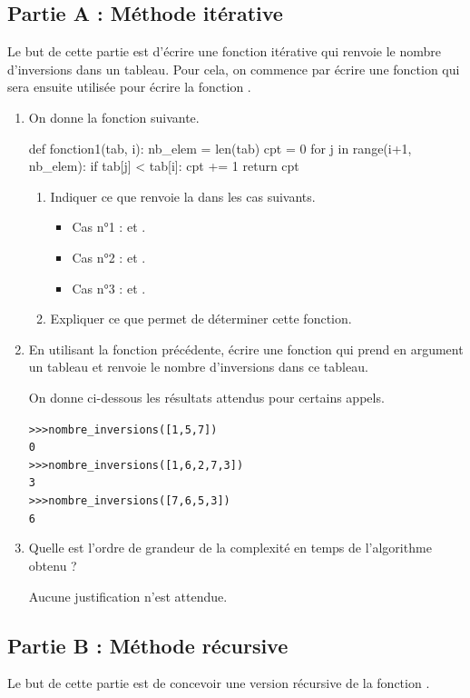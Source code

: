 \documentclass[11pt,a4paper,french,twoside]{PMCours}
\begin{document}
\subsection*{Partie A : Méthode itérative}
Le but de cette partie est d'écrire une fonction itérative  qui renvoie le
nombre d'inversions dans un tableau. Pour cela, on commence par écrire une fonction
 qui sera ensuite utilisée pour écrire la fonction .
\begin{enumerate}
    \item On donne la fonction suivante.
\begin{Python}
def fonction1(tab, i):
    nb_elem = len(tab)
    cpt = 0
    for j in range(i+1, nb_elem):
        if tab[j] < tab[i]:
            cpt += 1
    return cpt
\end{Python}
\begin{enumerate}
\item Indiquer ce que renvoie la  dans les cas suivants.
\begin{itemize}
\item Cas n°1 :  et .
\item Cas n°2 :  et .
\item Cas n°3 :  et .
\end{itemize}
\item Expliquer ce que permet de déterminer cette fonction.
\end{enumerate}
\item En utilisant la fonction précédente, écrire une fonction  qui
prend en argument un tableau et renvoie le nombre d'inversions dans ce tableau.

On donne ci-dessous les résultats attendus pour certains appels.
\begin{alltt}
>>> nombre\_inversions([1, 5, 7])
0
>>> nombre\_inversions([1, 6, 2, 7, 3])
3
>>> nombre\_inversions([7, 6, 5, 3])
6
\end{alltt}
\item Quelle est l'ordre de grandeur de la complexité en temps de l'algorithme obtenu ?

Aucune justification n'est attendue.
\end{enumerate}

\subsection*{Partie B : Méthode récursive}
Le but de cette partie est de concevoir une version récursive de la fonction
.
\end{document}

